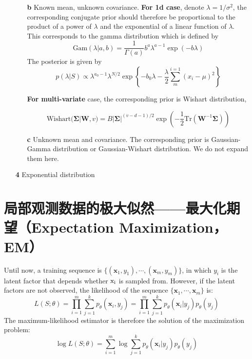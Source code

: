 \documentclass{article}
\begin{document}
\begin{itemize}
\begin{itemize}
	\item [\textbf{b}] Known mean, unknown covariance. \textbf{For 1d case}, denote $\lambda=1/\sigma^2$, the corresponding conjugate prior should therefore be proportional to the product of a power of $\lambda$ and the exponential of a linear function of $\lambda$. This corresponds to the gamma distribution which is defined by
	\begin{equation*}
	\mathrm{Gam}(\lambda|a,b) = \frac{1}{\Gamma(a)} b^a \lambda^{a-1} \exp(-b\lambda)
	\end{equation*}
	The posterior is given by
	\begin{equation*}
	p(\lambda|S)\propto \lambda^{a_0-1} \lambda^{N/2} \exp \left\{-b_0 \lambda - \frac{\lambda}{2}\sum^{i=1}_m (x_i-\mu)^2\right\}
	\end{equation*}
	
	\textbf{For multi-variate} case, the corresponding prior is Wishart distribution,
	
	\begin{equation*}
	\mathrm{Wishart}(\bm{\Sigma}|\bm{W},v)=B|\bm{\Sigma}|^{(v-d-1)/2} \exp \left(-\frac{1}{2} \mathrm{Tr} (\bm{W}^{-1}\bm{\Sigma})\right)
	\end{equation*}
	
	\item [\textbf{c}] Unknown mean and covariance. The corresponding prior is Gaussian-Gamma distribution or Gaussian-Wishart distribution. We do not expand them here.
	
	\end{itemize}		
	
	\item [\textbf{4}] Exponential distribution
	\end{itemize}
	
\section{局部观测数据的极大似然——最大化期望（Expectation Maximization，EM）}
	Until now, a training sequence is $\{(\bm{x}_1,y_1),\cdots,(\bm{x}_m,y_m)\}$, in which $y_i$ is the latent factor that depends whether $\rm{x}_i$ is sampled from. However, if the latent factors are not observed, the likelihood of the sequence $\{\bm{x}_1,\cdots,\bm{x}_m\}$ is:
	\begin{equation*}
	L(S;\theta) = \prod_{i=1}^m \sum_{j=1}^k p_\theta(\bm{x}_i,y_j) = \prod_{i=1}^m \sum_{j=1}^k p_\theta(\bm{x}_i|y_j)p_\theta(y_j)
	\end{equation*}
	The maximum-likelihood estimator is therefore the solution of the maximization problem:
	\begin{equation}
	\log L(S;\theta) = \sum_{i=1}^m \log \sum_{j=1}^k p_\theta(\bm{x}_i|y_j)p_\theta(y_j)
	\end{equation}
	
\end{document}

